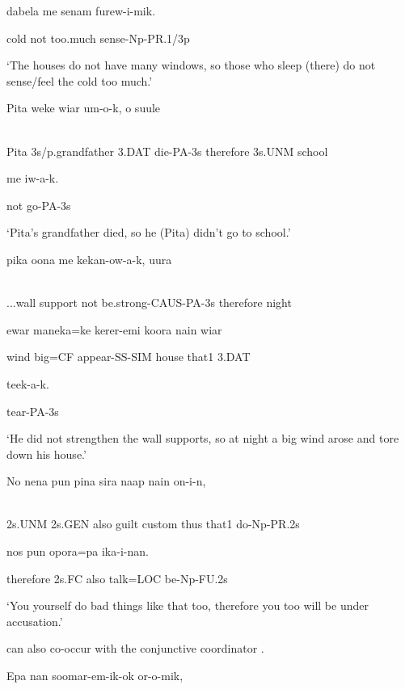 dabela  me  senam  furew-i-mik.

cold  not  too.much  sense-Np-PR.1/3p

`The houses do not have many windows, so those who sleep (there) do not sense/feel the cold too much.'

\ea%
\label{ex:x1402}
\gll Pita  weke  wiar  um-o-k,    o  suule  \\
      \\
\glt
\z

Pita  3s/p.grandfather  3.DAT  die-PA-3s  therefore  3s.UNM  school

me  iw-a-k.

not  go-PA-3s

`Pita's grandfather died, so he (Pita) didn't go to school.'

\ea%
\label{ex:x1405}
\gll {\dots}pika  oona  me  kekan-ow-a-k,    uura \\
      \\
\glt
\z

...wall  support  not  be.strong-CAUS-PA-3s  therefore  night

ewar  maneka=ke  kerer-emi  koora  nain  wiar

wind  big=CF  appear-SS-SIM  house  that1  3.DAT  

teek-a-k.

tear-PA-3s

`He did not strengthen the wall supports, so at night a big wind arose and tore down his house.'

\ea%
\label{ex:x1408}
\gll No  nena  pun  pina  sira  naap  nain  on-i-n, \\
      \\
\glt
\z

2s.UNM  2s.GEN  also  guilt  custom  thus  that1  do-Np-PR.2s

  nos  pun  opora=pa  ika-i-nan.

therefore  2s.FC  also  talk=LOC  be-Np-FU.2s

`You yourself do bad things like that too, therefore you too will be under accusation.'

 can also co-occur with the conjunctive coordinator . 

\ea%
\label{ex:x1403}
\gll Epa  nan  soomar-em-ik-ok  or-o-mik,  \\
      \\
\glt
\z

